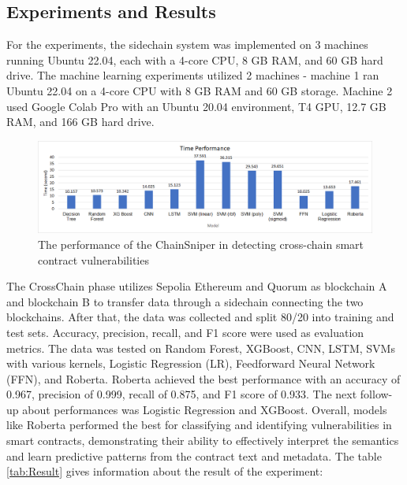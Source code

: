 \documentclass[sigconf]{acmart}
\begin{document}
\subsection{Experiments and Results}
For the experiments, the sidechain system was implemented on 3 machines running Ubuntu 22.04, each with a 4-core CPU, 8 GB RAM, and 60 GB hard drive. The machine learning experiments utilized 2 machines - machine 1 ran Ubuntu 22.04 on a 4-core CPU with 8 GB RAM and 60 GB storage. Machine 2 used Google Colab Pro with an Ubuntu 20.04 environment, T4 GPU, 12.7 GB RAM, and 166 GB hard drive.

\begin{figure}[h]
  \caption{The performance of the ChainSniper in detecting cross-chain smart contract vulnerabilities}
  \label{timePer}
  \centering
  \includegraphics[width=\textwidth]{timePerformance.png}
\end{figure}

The CrossChain phase utilizes Sepolia Ethereum and Quorum as blockchain A and blockchain B to transfer data through a sidechain connecting the two blockchains. After that, the data was collected and split 80/20 into training and test sets. Accuracy, precision, recall, and F1 score were used as evaluation metrics. The data was tested on Random Forest, XGBoost, CNN, LSTM, SVMs with various kernels, Logistic Regression (LR), Feedforward Neural Network (FFN), and Roberta. Roberta achieved the best performance with an accuracy of 0.967, precision of 0.999, recall of 0.875, and F1 score of 0.933. The next follow-up about performances was Logistic Regression and XGBoost. Overall, models like Roberta performed the best for classifying and identifying vulnerabilities in smart contracts, demonstrating their ability to effectively interpret the semantics and learn predictive patterns from the contract text and metadata. The table \ref{tab:Result} gives information about the result of the experiment:
\end{document}
